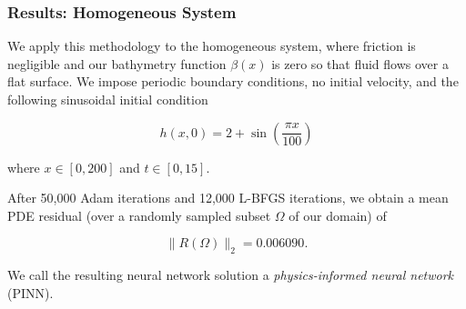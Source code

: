 \begin{frame}
    \frametitle{Results: Homogeneous System}

    We apply this methodology to the homogeneous system, where friction is negligible and our bathymetry function 
    $\beta(x)$ is zero so that fluid flows over a flat surface.  We impose periodic boundary conditions, no initial 
    velocity, and the following sinusoidal initial condition

    $$
    h(x, 0) = 2 + \sin{\left( \frac{\pi x}{100} \right)}
    $$

    where $x \in [0, 200]$ and $t \in [0, 15]$.

    \medskip
    \pause

    After 50,000 Adam iterations and 12,000 L-BFGS iterations, we obtain a mean PDE residual (over a randomly sampled 
    subset $\Omega$ of our domain) of 
    
    $$
    \lVert R(\Omega) \rVert_2 = 0.006090.
    $$

    We call the resulting neural network solution a \textit{physics-informed neural network} (PINN).
\end{frame}
